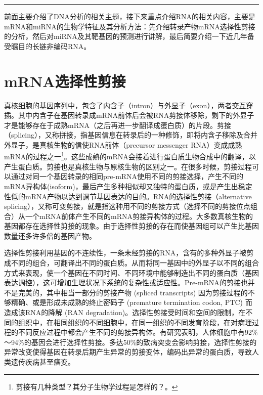 \documentclass[11pt,a4paper,twoside]{book}
\begin{document}
\hrule height 3pt
\vspace{0.5cm}

前面主要介绍了DNA分析的相关主题，接下来重点介绍RNA的相关内容，主要是mRNA和miRNA的生物学特征及其分析方法：先介绍转录产物mRNA选择性剪接的分析，然后对miRNA及其靶基因的预测进行讲解，最后简要介绍一下近几年备受瞩目的长链非编码RNA。

\section{mRNA选择性剪接}
真核细胞的基因序列中，包含了内含子（intron）与外显子（exon），两者交互穿插。其中内含子在基因转录成mRNA前体后会被RNA剪接体移除，剩下的外显子才是能够存在于成熟mRNA（之后再进一步翻译成蛋白质）的片段。剪接（splicing），又称拼接，指基因信息在转录后的一种修饰，即将内含子移除及合并外显子，是真核生物的信使RNA前体（precursor messenger RNA）变成成熟mRNA的过程之一\footnote{剪接有几种类型？其分子生物学过程是怎样的？。}。这些成熟的mRNA会接着进行蛋白质生物合成中的翻译，以产生蛋白质。剪接也是真核生物与原核生物的区别之一。在很多时候，剪接过程可以通过对同一个基因转录的相同pre-mRNA使用不同的剪接选择，产生不同的mRNA异构体(isoform)，最后产生多种相似却又独特的蛋白质，或是产生出稳定性低的mRNA产物以达到调节基因表达的目的。RNA的选择性剪接（alternative splicing），又称可变剪接，就是指这种用不同的剪接方式（选择不同的剪接位点组合）从一个mRNA前体产生不同的mRNA剪接异构体的过程。大多数真核生物的基因都存在选择性剪接的现象。由于选择性剪接的存在而使基因组可以产生比基因数量还多许多倍的基因产物。

选择性剪接利用基因的不连续性，一条未经剪接的RNA，含有的多种外显子被剪成不同的组合，可翻译出不同的蛋白质。从而将同一基因中的外显子以不同的组合方式来表现，使一个基因在不同时间、不同环境中能够制造出不同的蛋白质（基因表达调控），这可增加生理状况下系统的复杂性或适应性。Pre-mRNA的剪接也并不是完美的，其中相当一部分的剪接产物 (spliced transcripts) 因为剪接过程的不够精确、或是形成未成熟的终止密码子 (premature termination codon, PTC) 而造成该RNA的降解 (RAN degradation)。选择性剪接受时间和空间的限制，在不同的组织中，在相同组织的不同细胞中，在同一组织的不同发育阶段，在对病理过程的不同反应过程中都会产生不同的剪接异构体。有研究表明，人体细胞中有92\%～94\%的基因会进行选择性剪接。多达50\%的致病突变会影响剪接，选择性剪接的异常改变使得基因在转录后期产生异常的剪接变体，编码出异常的蛋白质，导致人类遗传疾病甚至癌变。
\end{document}

